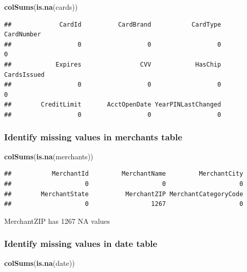 \documentclass[
]{article}
\newenvironment{Shaded}{\begin{snugshade}}{\end{snugshade}}
\newcommand{\FunctionTok}[1]{\textcolor[rgb]{0.13,0.29,0.53}{\textbf{#1}}}
\newcommand{\NormalTok}[1]{#1}
\begin{document}
\begin{Shaded}
\begin{Highlighting}[]
\FunctionTok{colSums}\NormalTok{(}\FunctionTok{is.na}\NormalTok{(cards))}
\end{Highlighting}
\end{Shaded}

\begin{verbatim}
##             CardId          CardBrand           CardType         CardNumber 
##                  0                  0                  0                  0 
##            Expires                CVV            HasChip        CardsIssued 
##                  0                  0                  0                  0 
##        CreditLimit       AcctOpenDate YearPINLastChanged 
##                  0                  0                  0
\end{verbatim}

\subsubsection{Identify missing values in merchants
table}\label{identify-missing-values-in-merchants-table}

\begin{Shaded}
\begin{Highlighting}[]
\FunctionTok{colSums}\NormalTok{(}\FunctionTok{is.na}\NormalTok{(merchants))}
\end{Highlighting}
\end{Shaded}

\begin{verbatim}
##           MerchantId         MerchantName         MerchantCity 
##                    0                    0                    0 
##        MerchantState          MerchantZIP MerchantCategoryCode 
##                    0                 1267                    0
\end{verbatim}

MerchantZIP has 1267 NA values

\subsubsection{Identify missing values in date
table}\label{identify-missing-values-in-date-table}

\begin{Shaded}
\begin{Highlighting}[]
\FunctionTok{colSums}\NormalTok{(}\FunctionTok{is.na}\NormalTok{(date))}
\end{Highlighting}
\end{Shaded}
\end{document}
